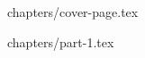 \documentclass{article}
\begin{document}


{chapters/cover-page.tex}

\tableofcontents
\clearpage

{chapters/part-1.tex}
\end{document}
